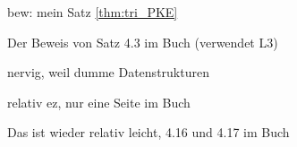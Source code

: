 \documentclass[../main.tex]{subfiles}
\begin{document}

bew: \say{$\Rightarrow$} mein Satz \ref{thm:tri_PKE}

\say{$\Leftarrow$} Der Beweis von Satz 4.3 im Buch (verwendet L3)


nervig, weil dumme Datenstrukturen


relativ ez, nur eine Seite im Buch


Das ist wieder relativ leicht, 4.16 und 4.17 im Buch
\end{document}
